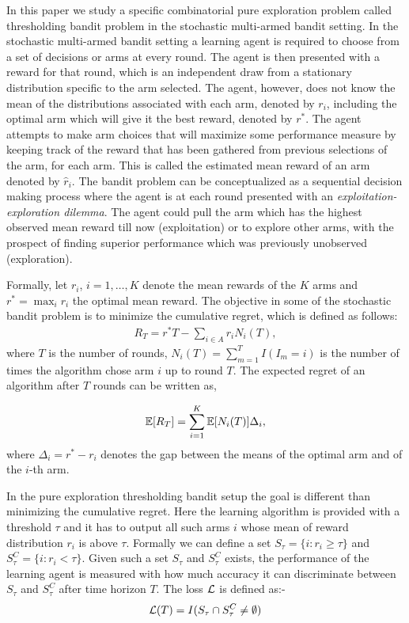 In this paper we study a specific combinatorial pure exploration problem called thresholding bandit problem in the stochastic multi-armed bandit setting. In the stochastic multi-armed bandit setting a learning agent is required to choose from a set of decisions or arms at every round. The agent is then presented with a reward for that round, which is an independent draw from a stationary distribution specific to the arm selected. The agent, however, does not know the mean of the distributions associated with each arm, denoted by $r_{i}$, including the optimal arm which will give it the best reward, denoted by $r^{*}$. The agent attempts to make arm choices that will maximize some performance measure by keeping track of the reward that has been gathered from previous selections of the arm, for each arm. This is called the estimated mean reward of an arm denoted by $\hat{r}_{i}$. The bandit problem can be conceptualized as a sequential decision making process where the agent is at each round presented with an \emph{exploitation-exploration dilemma}. The agent could pull the arm which has the highest observed mean reward till now (exploitation) or to explore other arms, with the prospect of finding superior performance which was previously unobserved (exploration). 

	Formally, let $r_i$, $i=1,\ldots,K$ denote the mean rewards of the $K$ arms and $r^* = \max_i r_i$ the optimal mean reward. The objective in some of the stochastic bandit problem is to minimize the cumulative regret, which is defined as follows:
\begin{align*}
R_{T}=r^{*}T - \sum_{i\in A} r_{i}N_{i}(T),
\end{align*}
where $T$ is the number of rounds, $N_{i}(T)=\sum_{m=1}^T I(I_m=i)$ is the number of times the algorithm chose arm $i$ up to round $T$.
The expected regret of an algorithm after $T$ rounds can be written as,

\begin{align*}
\mathbb{E}[R_{T}]= \sum_{i=1}^K \mathbb{E}[N_i(T)] \Delta_i,
\end{align*}
where $\Delta_{i}=r^{*}-r_{i}$ denotes the gap between the means of the optimal arm and of the $i$-th arm. 

	In the pure exploration thresholding bandit setup the goal is different than minimizing the cumulative regret. Here the learning algorithm is provided with a threshold $\tau$ and it has to output all such arms $i$ whose mean of reward distribution $r_{i}$ is above $\tau$. Formally we can define a set $S_{\tau}=\lbrace i: r_{i}\geq \tau \rbrace$ and $S_{\tau}^{C}=\lbrace i: r_{i} < \tau \rbrace$. Given such a set $S_{\tau}$ and $S_{\tau}^{C}$ exists, the performance of the learning agent is measured with how much accuracy it can discriminate between $S_{\tau}$ and $S_{\tau}^{C}$ after time horizon $T$. The loss $\mathcal{L}$ is defined as:-
\begin{align*}
\mathcal{L} (T) = I(S_{\tau}\cap S_{\tau}^{C} \neq \emptyset)
\end{align*}	
		
